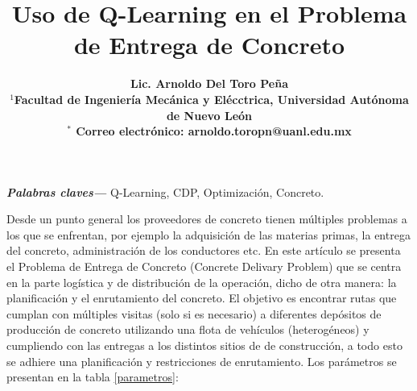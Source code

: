 \documentclass[10pt]{article}
\title{\bf Uso de Q-Learning en el Problema de Entrega de Concreto}
\author{\bf Lic. Arnoldo Del Toro Peña \\
\normalsize{
$^{1}$Facultad de Ingeniería Mecánica y Elécctrica, Universidad Autónoma de Nuevo León}\\
\normalsize{
$^\ast$ Correo electr\'onico:  arnoldo.toropn@uanl.edu.mx}
}
\date{\empty}
\providecommand{\keywords}[1]
{
  \small	
  \textbf{\textit{Palabras claves---}} #1
}
\begin{document}
\maketitle
\keywords{Q-Learning, CDP, Optimización, Concreto.}\\
\medskip

%
%
Desde un punto general los proveedores de concreto tienen múltiples problemas a los que se enfrentan, por ejemplo la adquisición de las materias primas, la entrega del concreto, administración de los conductores etc. En este artículo se presenta el Problema de Entrega de Concreto (Concrete Delivary Problem) que se centra en la parte logística y de distribución de la operación, dicho de otra manera: la planificación y el enrutamiento del concreto. El objetivo es encontrar rutas que cumplan con múltiples visitas (solo si es necesario) a diferentes depósitos de producción de concreto utilizando una flota de vehículos (heterogéneos) y cumpliendo con las entregas a los distintos sitios de de construcción, a todo esto se adhiere una planificación y restricciones de enrutamiento. Los parámetros se presentan en la tabla \ref{parametros}:
\end{document}
